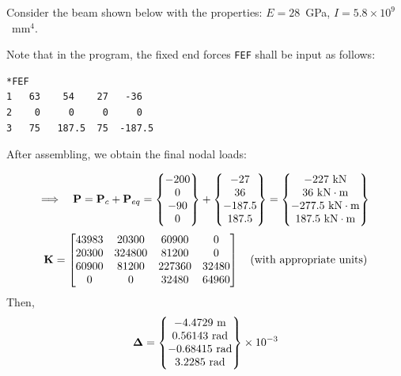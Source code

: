 \begin{example}
Consider the beam shown below with the properties: $E = 28$~GPa, $I = 5.8\times10^9$~mm$^4$.
\begin{fig}
  
\end{fig}
\begin{fig}
  
\end{fig}
\begin{fig}
  
\end{fig}
Note that in the program, the fixed end forces \texttt{FEF} shall be input as follows:
\begin{lstlisting}[language={},numbers=none,basicstyle=\small\ttfamily]
*FEF
1   63    54    27   -36
2    0     0     0     0
3   75   187.5  75  -187.5
\end{lstlisting}
After assembling, we obtain the final nodal loads:
\begin{fig}
  
\end{fig}
\begin{equation*}
  \Longrightarrow\quad \mathbf{P} = \mathbf{P}_c + \mathbf{P}_{eq} = \begin{Bmatrix}-200\\ 0\\ -90\\ 0\end{Bmatrix} + \begin{Bmatrix}-27\\ 36\\ -187.5\\ 187.5\end{Bmatrix}
  = \begin{Bmatrix}-227\text{ kN}\\ 36\text{ kN}\cdot\text{m}\\ -277.5\text{ kN}\cdot\text{m}\\ 187.5\text{ kN}\cdot\text{m}\end{Bmatrix}
\end{equation*}
\begin{equation*}
  \mathbf{K} = \begin{bmatrix}43983 & 20300 & 60900 & 0\\ 20300 & 324800 & 81200 & 0\\ 60900 & 81200 & 227360 & 32480\\ 0 & 0 & 32480 & 64960\end{bmatrix}\quad\text{(with appropriate units)}
\end{equation*}
Then,
\begin{equation*}
  \bm{\Delta} = \begin{Bmatrix}-4.4729\text{ m}\\ 0.56143\text{ rad}\\ -0.68415\text{ rad}\\ 3.2285\text{ rad}\end{Bmatrix}\times10^{-3}
\end{equation*}


\end{example}
